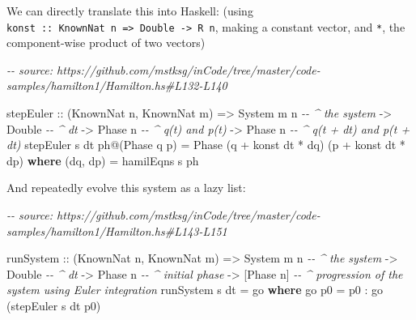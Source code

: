 \documentclass[]{article}
\newenvironment{Shaded}{}{}
\newcommand{\CommentTok}[1]{\textcolor[rgb]{0.38,0.63,0.69}{\textit{#1}}}
\newcommand{\DataTypeTok}[1]{\textcolor[rgb]{0.56,0.13,0.00}{#1}}
\newcommand{\KeywordTok}[1]{\textcolor[rgb]{0.00,0.44,0.13}{\textbf{#1}}}
\newcommand{\NormalTok}[1]{#1}
\newcommand{\OperatorTok}[1]{\textcolor[rgb]{0.40,0.40,0.40}{#1}}
\newcommand{\OtherTok}[1]{\textcolor[rgb]{0.00,0.44,0.13}{#1}}
\begin{document}
We can directly translate this into Haskell: (using
\texttt{konst\ ::\ KnownNat\ n\ =\textgreater{}\ Double\ -\textgreater{}\ R\ n},
making a constant vector, and \texttt{*}, the component-wise product of two
vectors)

\begin{Shaded}
\begin{Highlighting}[]
\CommentTok{{-}{-} source: https://github.com/mstksg/inCode/tree/master/code{-}samples/hamilton1/Hamilton.hs\#L132{-}L140}

\NormalTok{stepEuler}
\OtherTok{    ::}\NormalTok{ (}\DataTypeTok{KnownNat}\NormalTok{ n, }\DataTypeTok{KnownNat}\NormalTok{ m)}
    \OtherTok{=>} \DataTypeTok{System}\NormalTok{ m n       }\CommentTok{{-}{-} \^{} the system}
    \OtherTok{{-}>} \DataTypeTok{Double}           \CommentTok{{-}{-} \^{} dt}
    \OtherTok{{-}>} \DataTypeTok{Phase}\NormalTok{ n          }\CommentTok{{-}{-} \^{} q(t) and p(t)}
    \OtherTok{{-}>} \DataTypeTok{Phase}\NormalTok{ n          }\CommentTok{{-}{-} \^{} q(t + dt) and p(t + dt)}
\NormalTok{stepEuler s dt ph}\OperatorTok{@}\NormalTok{(}\DataTypeTok{Phase}\NormalTok{ q p) }\OtherTok{=} \DataTypeTok{Phase}\NormalTok{ (q }\OperatorTok{+}\NormalTok{ konst dt }\OperatorTok{*}\NormalTok{ dq) (p }\OperatorTok{+}\NormalTok{ konst dt }\OperatorTok{*}\NormalTok{ dp)}
  \KeywordTok{where}
\NormalTok{    (dq, dp) }\OtherTok{=}\NormalTok{ hamilEqns s ph}
\end{Highlighting}
\end{Shaded}

And repeatedly evolve this system as a lazy list:

\begin{Shaded}
\begin{Highlighting}[]
\CommentTok{{-}{-} source: https://github.com/mstksg/inCode/tree/master/code{-}samples/hamilton1/Hamilton.hs\#L143{-}L151}

\NormalTok{runSystem}
\OtherTok{    ::}\NormalTok{ (}\DataTypeTok{KnownNat}\NormalTok{ n, }\DataTypeTok{KnownNat}\NormalTok{ m)}
    \OtherTok{=>} \DataTypeTok{System}\NormalTok{ m n       }\CommentTok{{-}{-} \^{} the system}
    \OtherTok{{-}>} \DataTypeTok{Double}           \CommentTok{{-}{-} \^{} dt}
    \OtherTok{{-}>} \DataTypeTok{Phase}\NormalTok{ n          }\CommentTok{{-}{-} \^{} initial phase}
    \OtherTok{{-}>}\NormalTok{ [}\DataTypeTok{Phase}\NormalTok{ n]        }\CommentTok{{-}{-} \^{} progression of the system using Euler integration}
\NormalTok{runSystem s dt }\OtherTok{=}\NormalTok{ go}
  \KeywordTok{where}
\NormalTok{    go p0 }\OtherTok{=}\NormalTok{ p0 }\OperatorTok{:}\NormalTok{ go (stepEuler s dt p0)}
\end{Highlighting}
\end{Shaded}
\end{document}
